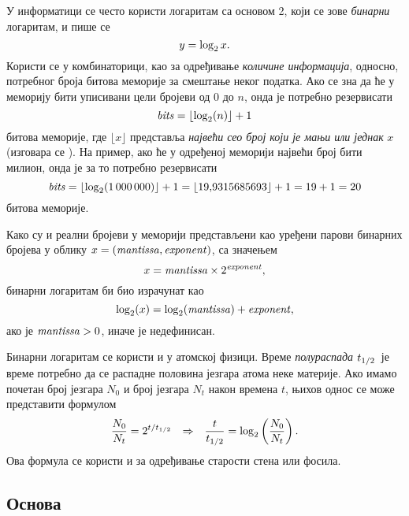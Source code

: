 \def\lb{\mathop{\rm lb}}
\def\bits{{\it bits}}
\def\mant{\textit{mantissa\/}}%
\def\expo{\textit{exponent\/}}%
\def\znak{{\it знак}}%

У информатици се често користи логаритам са основом 2, који се зове
{\sl бинарни\/} логаритам, и пише се
$$
y=\log_2 x.
$$
Користи се у комбинаторици, као за одређивање {\sl количине информација},
односно, потребног броја битова меморије за смештање неког податка.
Ако се зна да ће у меморију бити уписивани цели бројеви од
0 до $n$, онда је потребно резервисати
\begin{equation}\label{eq:bits}
  \bits = \lfloor\logtwo(n)\rfloor+1
\end{equation}
битова меморије, где $\lfloor x\rfloor$ 
представља {\sl највећи сео број који је мањи или једнак} $x$
(изговара се ).
На пример, ако ће у одређеној меморији највећи  
број бити милион, онда је за то потребно резервисати
$$
\bits=\lfloor\logtwo(1\,000\,000)\rfloor+1=\lfloor 19\.9315685693\rfloor+1 = 19+1=20
$$
битова меморије.

Како су и реални бројеви у меморији представљени као уређени парови бинарних бројева у облику
$x=(\mant,\expo)$, са значењем
$$
x=\mant\puta2^\expo,
$$
бинарни логаритам би био израчунат као
$$
\logtwo(x)=\logtwo(\mant)+\expo,
$$
ако је $\mant>0$, иначе је недефинисан.

\smallskip

Бинарни логаритам се користи и у атомској физици.
Време {\sl полураспада\/} $t_{1/2}$\
је време потребно да се распадне половина језгара атома неке материје.
Ако имамо почетан број језгара
$N_0$ и број језгара $N_t$ након времена $t$, њихов однос
се може представити формулом
\begin{equation}
\label{eq:halftime}
\frac{N_0}{N_t}=2^{t/t_{1/2}}{\quad\Rightarrow\quad} \frac{t}{t_{1/2}}=\log_2\left( \frac{N_0}{N_t} \right).
\end{equation}
Ова формула се користи и за одређивање старости стена или фосила.



\subsection{Основа \e}

